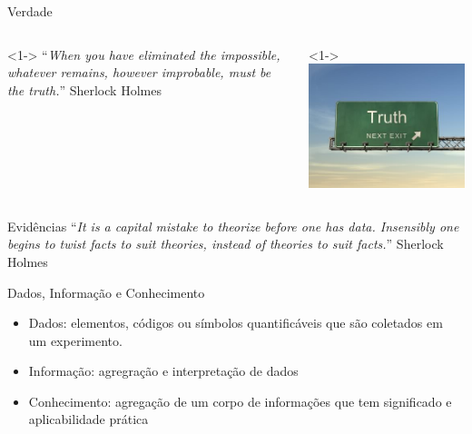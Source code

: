 \documentclass{beamer}
\begin{document}
\begin{frame}{Verdade}
  \begin{columns}
    \begin{column}{6cm}<1-> ``{\em When you have eliminated the
        impossible, whatever remains, however improbable, must be the
        truth.}'' Sherlock Holmes
    \end{column}
    \begin{column}{4cm}<1->
      \includegraphics[height=0.4\textheight]{truth}
    \end{column}
  \end{columns}
\end{frame}


\begin{frame}{Evidências}
  ``{\em It is a capital mistake to theorize before one has
    data. Insensibly one begins to twist facts to suit theories,
    instead of theories to suit facts.}'' Sherlock Holmes
\end{frame}


\begin{frame}{Dados, Informação e Conhecimento}
  \begin{itemize}
  \item Dados: elementos, códigos ou símbolos quantificáveis que são
    coletados em um experimento.
  \item Informação: agregração e interpretação de dados
  \item Conhecimento: agregação de um corpo de informações que tem
    significado e aplicabilidade prática
  \end{itemize}
\end{frame}
\end{document}
